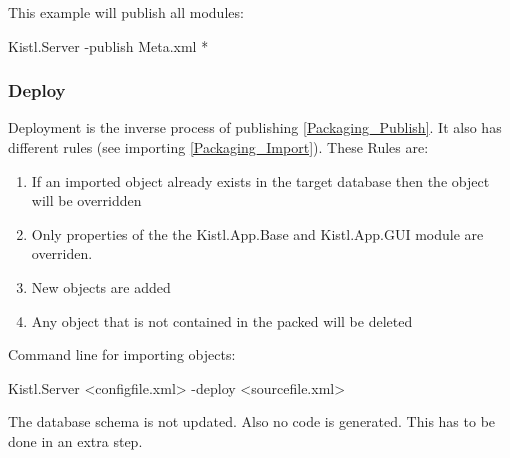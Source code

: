 This example will publish all modules:
\begin{CS}
Kistl.Server -publish Meta.xml *
\end{CS}


\subsubsection{\label{Packaging_Deploy}Deploy}

Deployment is the inverse process of publishing \ref{Packaging_Publish}. It also has different rules (see importing \ref{Packaging_Import}).
These Rules are:

\begin{enumerate}
 \item If an imported object already exists in the target database then the object will be overridden
 \item Only properties of the the Kistl.App.Base and Kistl.App.GUI module are overriden.
 \item New objects are added
 \item Any object that is not contained in the packed will be deleted
\end{enumerate}

Command line for importing objects:
\begin{CS}
Kistl.Server <configfile.xml> -deploy <sourcefile.xml>
\end{CS}

The database schema is not updated. Also no code is generated. This has to be done in an extra step.


